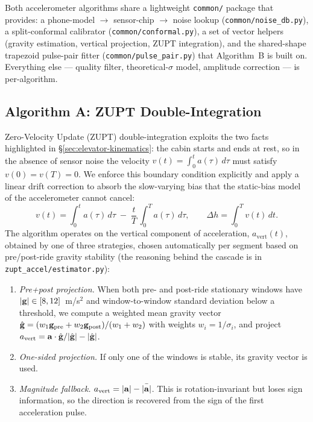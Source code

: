 Both accelerometer algorithms share a lightweight \texttt{common/}
package that provides: a phone-model $\to$ sensor-chip $\to$ noise
lookup (\texttt{common/noise\_db.py}), a split-conformal calibrator
(\texttt{common/conformal.py}), a set of vector helpers (gravity
estimation, vertical projection, ZUPT integration), and the
shared-shape trapezoid pulse-pair fitter
(\texttt{common/pulse\_pair.py}) that Algorithm~B is built on.
Everything else — quality filter, theoretical-$\sigma$ model,
amplitude correction — is per-algorithm.

\subsection{Algorithm A: ZUPT Double-Integration}
\label{sec:algo-zupt}

Zero-Velocity Update (ZUPT) double-integration exploits the two facts
highlighted in \S\ref{sec:elevator-kinematics}: the cabin starts and
ends at rest, so in the absence of sensor noise the velocity
$v(t)=\int_0^t a(\tau)\,d\tau$ must satisfy $v(0)=v(T)=0$. We enforce
this boundary condition explicitly and apply a linear drift correction
to absorb the slow-varying bias that the static-bias model of the
accelerometer cannot cancel:
\begin{equation}
  v(t) = \int_0^t a(\tau)\,d\tau \;-\; \frac{t}{T}\,\int_0^T a(\tau)\,d\tau,
  \qquad
  \Delta h = \int_0^T v(t)\,dt.
  \label{eq:zupt-corr}
\end{equation}
The algorithm operates on the vertical component of acceleration,
$a_\mathrm{vert}(t)$, obtained by one of three strategies, chosen
automatically per segment based on pre/post-ride gravity stability
(the reasoning behind the cascade is in \texttt{zupt\_accel/estimator.py}):
\begin{enumerate}
  \item[(i)]   \emph{Pre+post projection.} When both pre- and post-ride
               stationary windows have $|{\bf g}|\in[8,12]$~m/s$^2$ and
               window-to-window standard deviation below a threshold,
               we compute a weighted mean gravity vector
               $\hat{\bf g}=(w_1{\bf g}_{\rm pre}+w_2{\bf g}_{\rm post})/(w_1+w_2)$
               with weights $w_i=1/\sigma_i$, and project
               $a_\mathrm{vert}=\mathbf{a}\cdot\hat{\bf g}/|\hat{\bf g}|-|\hat{\bf g}|$.
  \item[(ii)]  \emph{One-sided projection.} If only one of the windows
               is stable, its gravity vector is used.
  \item[(iii)] \emph{Magnitude fallback.}
               $a_\mathrm{vert}=|{\bf a}|-\bar{|{\bf a}|}$. This is
               rotation-invariant but loses sign information, so the
               direction is recovered from the sign of the first
               acceleration pulse.
\end{enumerate}
